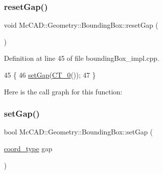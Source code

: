 \mbox{\label{classMcCAD_1_1Geometry_1_1BoundingBox_abdedc7a259eca39fbfab2fa8fdd17a07}} 
\subsubsection{\texorpdfstring{reset\+Gap()}{resetGap()}\hspace{0.1cm}{\footnotesize\ttfamily [2/2]}}
{\footnotesize\ttfamily void Mc\+C\+A\+D\+::\+Geometry\+::\+Bounding\+Box\+::reset\+Gap (\begin{DoxyParamCaption}{ }\end{DoxyParamCaption})}



Definition at line 45 of file bounding\+Box\+\_\+impl.\+cpp.


\begin{DoxyCode}
45                                   \{
46     \hyperlink{classMcCAD_1_1Geometry_1_1BoundingBox_a78c149a7c7e7d6074a2b726a63c3c400}{setGap}(\hyperlink{namespaceMcCAD_1_1Geometry_ac29462a1071e96a3eb0bce1b4097af64}{CT\_0}());
47 \}
\end{DoxyCode}
Here is the call graph for this function\+:
\mbox{\label{classMcCAD_1_1Geometry_1_1BoundingBox_a78c149a7c7e7d6074a2b726a63c3c400}} 
\subsubsection{\texorpdfstring{set\+Gap()}{setGap()}\hspace{0.1cm}{\footnotesize\ttfamily [1/2]}}
{\footnotesize\ttfamily bool Mc\+C\+A\+D\+::\+Geometry\+::\+Bounding\+Box\+::set\+Gap (\begin{DoxyParamCaption}\item[{\hyperlink{namespaceMcCAD_1_1Geometry_ac043b37a4a7e849fca22869e1982d2f8}{coord\+\_\+type}}]{gap }\end{DoxyParamCaption})}

